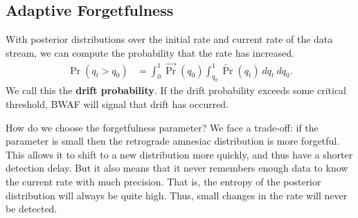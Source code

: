 \subsection{Adaptive Forgetfulness}

With posterior distributions over the initial rate and current rate of the data stream, we can compute the probability that the rate has increased. 
\begin{align}
    \Pr(q_t > q_0) &= \int_0^1 \overrightarrow{\Pr}(q_0) \int_{q_0}^1 \overleftarrow{\Pr}(q_t) ~dq_t ~ dq_0.
\end{align}
We call this the {\bf drift probability}. If the drift probability exceeds some critical threshold, BWAF will signal that drift has occurred.


How do we choose the forgetfulness parameter? We face a trade-off: if the parameter is small then the retrograde amnesiac distribution is more forgetful. This allows it to shift to a new distribution more quickly, and thus have a shorter detection delay. But it also means that it never remembers enough data to know the current rate with much precision. That is, the entropy of the posterior distribution will always be quite high. Thus, small changes in the rate will never be detected.

